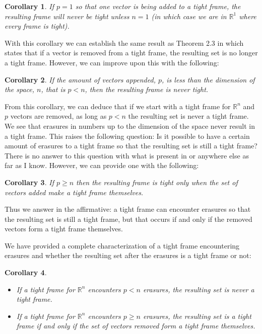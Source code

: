 \documentclass[11pt, reqno]{amsart}
\providecommand{\R}{\mathbb R}
\newtheorem{corollary}{Corollary}[theorem]
\numberwithin{equation}{section}
\begin{document}
\begin{corollary}
	If $p=1$ so that one vector is being added to a tight frame, the resulting frame will never be tight unless $n=1$ (in which case we are in $\R^1$ where every frame is tight).
\end{corollary}

With this corollary we can establish the same result as Theorem 2.3 in \cite{Datta2020} which states that if a vector is removed from a tight frame, the resulting set is no longer a tight frame. However, we can improve upon this with the following:

\begin{corollary}
	If the amount of vectors appended, $p$, is less than the dimension of the space, $n$, that is $p<n$, then the resulting frame is never tight.
\end{corollary}

From this corollary, we can deduce that if we start with a tight frame for $\R^n$ and $p$ vectors are removed, as long as $p<n$ the resulting set is never a tight frame. We see that erasures in numbers up to the dimension of the space never result in a tight frame. This raises the following question: Is it possible to have a certain amount of erasures to a tight frame so that the resulting set is still a tight frame? There is no answer to this question with what is present in \cite{Datta2020} or anywhere else as far as I know. However, we can provide one with the following:

\begin{corollary}
	If $p \geq n$ then the resulting frame is tight only when the set of vectors added make a tight frame themselves.
\end{corollary}

Thus we answer in the affirmative: a tight frame can encounter erasures so that the resulting set is still a tight frame, but that occurs if and only if the removed vectors form a tight frame themselves.

We have provided a complete characterization of a tight frame encountering erasures and whether the resulting set after the erasures is a tight frame or not:

\begin{corollary} \hfill
	\begin{itemize}
		\item If a tight frame for $\R^n$ encounters $p < n$ erasures, the resulting set is never a tight frame.
		\item If a tight frame for $\R^n$ encounters $p \geq n$ erasures, the resulting set is a tight frame if and only if the set of vectors removed form a tight frame themselves.
	\end{itemize}
\end{corollary}
\end{document}
